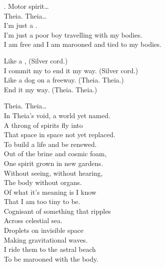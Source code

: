 
. Motor spirit… \\

Theia. Theia… \\

I'm just a . \\
I'm just a poor boy travelling with my bodies. \\
I am free and I am marooned and tied to my bodies. \\


Like a , (Silver cord.) \\
I commit my  to end it my way.  (Silver cord.) \\

Like a dog on a freeway. (Theia. Theia.) \\
End it my way. (Theia. Theia.) \\


Theia. Theia… \\

In Theia's void, a world yet named. \\
A throng of spirits fly into \\
That space in space not yet replaced. \\
To build a life and be renewed. \\
Out of the brine and cosmic foam, \\
One spirit grown in new gardens. \\
Without seeing, without hearing, \\
The body without organs. \\

Of what it's meaning is I know \\
That I am too tiny to be. \\
Cognisant of something that ripples \\
Across celestial sea. \\
Droplets on invisible space \\
Making gravitational waves. \\
I ride them to the astral beach \\
To be marooned with the body. \\


